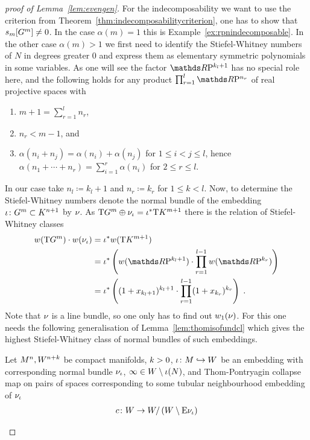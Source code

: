\begin{proof}[proof of
  Lemma~\ref{lem:evengen}]
  For the indecomposability we want to use the criterion from
  Theorem~\ref{thm:indecomposabilitycriterion}, \idest one has to show
  that $s_{m}[G^{m}]\neq 0$.
  In the case $\alpha(m)=1$ this is Example~\ref{ex:rpnindecomposable}.
  In the other case $\alpha(m)>1$ we first need to identify the
  Stiefel-Whitney numbers of $N$ in degrees greater 0 and express them
  as elementary symmetric polynomials in some variables.
  As one will see the factor $\RP{k_l+1}$ has no special role here,
  and the following holds for any product $\prod_{r=1}^{l}\RP{n_r}$ of
  real projective spaces with
  \begin{enumerate}
  \item $m+1=\sum_{r=1}^l n_r$,
  \item $n_r<m-1$, and
  \item $\alpha(n_i+n_j)=\alpha(n_i)+\alpha(n_j)$
    for $1\leq i<j\leq l$,
    hence $\alpha(n_1+\dotsb+n_r)=\sum_{i=1}^{r}\alpha(n_i)$
    for $2\leq r\leq l$.
  \end{enumerate}
  In our case take $n_l\coloneqq k_l+1$ and 
  $n_r\coloneqq k_r$ for $1\leq k<l$.
  Now, to determine the Stiefel-Whitney numbers 
  denote the normal bundle of the embedding
  ${\iota}\colon G^{m}\subset K^{n+1}$ by $\nu_{}$. 
  As $\mathrm{T}G^{m}\oplus\nu_{{\iota}}={{\iota}}^*\mathrm{T}K^{m+1}$ there is the relation
  of Stiefel-Whitney classes
  \begin{align*}
    \W{\T{\G m}} \cdot \W{\N\emb}
    &= \pb\emb\W{\T{K^{m+1}}} \\
    &= \pb\emb\left(
      \W{\RP{k_l+1}}
      \cdot \prod_{r=1}^{l-1}\W{\RP{k_r}}
      \right) \\
    &= \pb\emb\left(
      (1+x_{k_l+1})^{k_l+1}
      \cdot \prod_{r=1}^{l-1}(1+x_{k_r})^{k_r}
      \right)
      \;.
  \end{align*}
  Note that $\nu_{}$ is a line bundle, so one only has to find out
  ${w_{1}}(\nu_{})$. For this one needs the following
  generalisation of Lemma~\ref{lem:thomisofundcl} which gives the
  highest Stiefel-Whitney class of normal bundles of such embeddings.
  \begin{Lem}
    Let $M^n, W^{n+k}$ be compact manifolds, $k>0$,
    ${\iota}\colon M\hookrightarrow W$ be an embedding with corresponding normal
    bundle $\nu_{{\iota}}$, $\infty\in W\setminus{\iota}(N)$, and
    Thom-Pontryagin collapse map on pairs of spaces corresponding to
    some tubular neighbourhood embedding of $\nu_{{\iota}}$
    \begin{gather*}
      \collapse\colon
      W
      \to W/\left( W\setminus \E{\N{\emb}} \right)

\end{gather*}
\end{Lem}
\end{proof}
